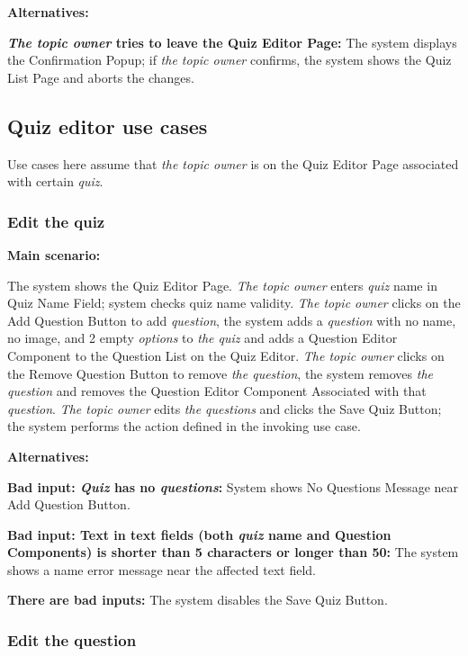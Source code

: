 \documentclass[
    english, %
]{VUMIFPSkursinis}
\begin{document}
\noindent\textbf{\fontsize{13}{15}\selectfont Alternatives:}

\textbf{\textit{The topic owner} tries to leave the Quiz Editor Page:} The system displays the Confirmation Popup; if \textit{the topic owner} confirms, the system shows the Quiz List Page and aborts the changes.

\subsection{Quiz editor use cases}

Use cases here assume that \textit{the topic owner} is on the Quiz Editor Page associated with certain \textit{quiz}.

\subsubsection{Edit the quiz}

\noindent\textbf{\fontsize{13}{15}\selectfont Main scenario:}

The system shows the Quiz Editor Page. \textit{The topic owner} enters \textit{quiz} name in Quiz Name Field; system checks quiz name validity. \textit{The topic owner} clicks on the Add Question Button to add \textit{question}, the system adds a \textit{question} with no name, no image, and 2 empty \textit{options} to \textit{the quiz} and adds a Question Editor Component to the Question List on the Quiz Editor. \textit{The topic owner} clicks on the Remove Question Button to remove \textit{the question}, the system removes \textit{the question} and removes the Question Editor Component Associated with that \textit{question}. \textit{The topic owner} edits \textit{the questions} and clicks the Save Quiz Button; the system performs the action defined in the invoking use case.

\noindent\textbf{\fontsize{13}{15}\selectfont Alternatives:}

\textbf{Bad input: \textit{Quiz} has no \textit{questions}:} System shows No Questions Message near Add Question Button.

\textbf{Bad input: Text in text fields (both \textit{quiz} name and Question Components) is shorter than 5 characters or longer than 50:} The system shows a name error message near the affected text field.

\textbf{There are bad inputs:} The system disables the Save Quiz Button.

\subsubsection{Edit the question}
\end{document}
